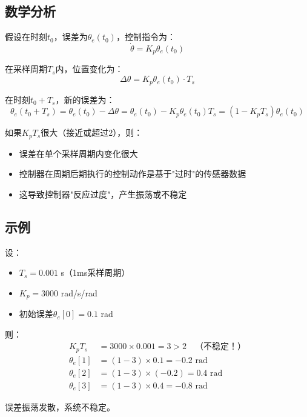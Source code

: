 \documentclass[12pt,a4paper]{article}
\begin{document}
\subsection{数学分析}

假设在时刻$t_0$，误差为$\theta_e(t_0)$，控制指令为：
\begin{equation}
\dot{\theta} = K_p \theta_e(t_0)
\end{equation}

在采样周期$T_s$内，位置变化为：
\begin{equation}
\Delta \theta = K_p \theta_e(t_0) \cdot T_s
\end{equation}

在时刻$t_0 + T_s$，新的误差为：
\begin{equation}
\theta_e(t_0 + T_s) = \theta_e(t_0) - \Delta \theta = \theta_e(t_0) - K_p \theta_e(t_0) T_s = (1 - K_p T_s)\theta_e(t_0)
\end{equation}

如果$K_p T_s$很大（接近或超过2），则：
\begin{itemize}
\item 误差在单个采样周期内变化很大
\item 控制器在周期后期执行的控制动作是基于"过时"的传感器数据
\item 这导致控制器"反应过度"，产生振荡或不稳定
\end{itemize}

\subsection{示例}

设：
\begin{itemize}
\item $T_s = 0.001$ s（1ms采样周期）
\item $K_p = 3000$ rad/s/rad
\item 初始误差$\theta_e[0] = 0.1$ rad
\end{itemize}

则：
\begin{align}
K_p T_s &= 3000 \times 0.001 = 3 > 2 \quad \text{（不稳定！）} \\
\theta_e[1] &= (1 - 3) \times 0.1 = -0.2 \text{ rad} \\
\theta_e[2] &= (1 - 3) \times (-0.2) = 0.4 \text{ rad} \\
\theta_e[3] &= (1 - 3) \times 0.4 = -0.8 \text{ rad}
\end{align}

误差振荡发散，系统不稳定。
\end{document}
